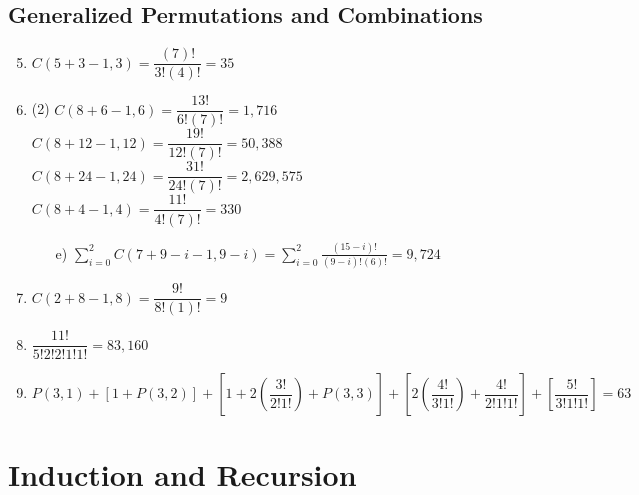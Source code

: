 \documentclass[12pt, A4]{article}
\begin{document}
		\subsection{Generalized Permutations and Combinations}
			\begin{enumerate}
				\setcounter{enumi}{4}
				\item
					\(C(5 + 3 - 1, 3) = \dfrac{(7)!}{3!(4)!} = 35\)
				\setcounter{enumi}{8}
				\item
					\begin{tasks}(2)
						\task
							\(C(8 + 6 - 1, 6) = \dfrac{13!}{6!(7)!} = 1,716\)	
						\task
							\(C(8 + 12 - 1, 12) = \dfrac{19!}{12!(7)!} = 50,388\)
						\task
							\(C(8 + 24 - 1, 24) = \dfrac{31!}{24!(7)!} = 2,629,575\)
						\task
							\(C(8 + 4 - 1, 4) = \dfrac{11!}{4!(7)!} = 330\)
					\end{tasks}
					\begin{itemize}[leftmargin = 1.04cm]
						\item[e)]
							\(\displaystyle \sum_{i = 0}^{2} C(7 + 9 - i - 1, 9 - i) = \sum_{i = 0}^2 \frac{(15 - i)!}{(9 - i)!(6)!} = 9,724\)	
					\end{itemize}
				\setcounter{enumi}{10}
				\item
					\(C(2 + 8 - 1, 8) = \dfrac{9!}{8!(1)!} = 9\)
				\setcounter{enumi}{32}
				\item
					\(\dfrac{11!}{5!2!2!1!1!} = 83,160\)
				\setcounter{enumi}{34}
				\item
					\(P(3, 1) + [1 + P(3, 2)] + \left[1 + 2\left(\dfrac{3!}{2!1!}\right) + P(3, 3)\right] + \left[2\left(\dfrac{4!}{3!1!}\right) + \dfrac{4!}{2!1!1!}\right] + \left[\dfrac{5!}{3!1!1!}\right] = 63\)
			\end{enumerate}
	\setcounter{section}{4}
	\section{Induction and Recursion}
\end{document}
